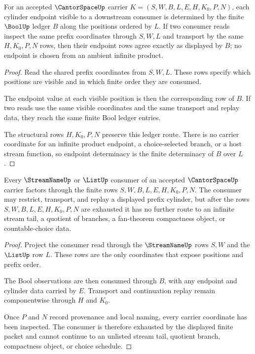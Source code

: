 \begin{theorem}
\label{thm:cantor-space-bool-cylinder-endpoint-determinacy}
For an accepted $\CantorSpaceUp$ carrier $K=(S,W,B,L,E,H,K_0,P,N)$, each cylinder endpoint visible to a downstream consumer is determined by the finite $\BoolUp$ ledger $B$ along the positions ordered by $L$. If two consumer reads inspect the same prefix coordinates through $S,W,L$ and transport by the same $H,K_0,P,N$ rows, then their endpoint rows agree exactly as displayed by $B$; no endpoint is chosen from an ambient infinite product.
\end{theorem}
\begin{proof}
Read the shared prefix coordinates from $S,W,L$. These rows specify which positions are visible and in which finite order they are consumed.

The endpoint value at each visible position is then the corresponding row of $B$. If two reads use the same visible coordinates and the same transport and replay data, they reach the same finite Bool ledger entries.

The structural rows $H,K_0,P,N$ preserve this ledger route. There is no carrier coordinate for an infinite product endpoint, a choice-selected branch, or a host stream function, so endpoint determinacy is the finite determinacy of $B$ over $L$.
\end{proof}

\begin{theorem}
\label{thm:cantor-space-streamname-prefix-consumer-exhaustion}
Every $\StreamNameUp$ or $\ListUp$ consumer of an accepted $\CantorSpaceUp$ carrier factors through the finite rows $S,W,B,L,E,H,K_0,P,N$. The consumer may restrict, transport, and replay a displayed prefix cylinder, but after the rows $S,W,B,L,E,H,K_0,P,N$ are exhausted it has no further route to an infinite stream tail, a quotient of branches, a fan-theorem compactness object, or countable-choice data.
\end{theorem}
\begin{proof}
Project the consumer read through the $\StreamNameUp$ rows $S,W$ and the $\ListUp$ row $L$. These rows are the only coordinates that expose positions and prefix order.

The Bool observations are then consumed through $B$, with any endpoint and cylinder data carried by $E$. Transport and continuation replay remain componentwise through $H$ and $K_0$.

Once $P$ and $N$ record provenance and local naming, every carrier coordinate has been inspected. The consumer is therefore exhausted by the displayed finite packet and cannot continue to an unlisted stream tail, quotient branch, compactness object, or choice schedule.
\end{proof}

